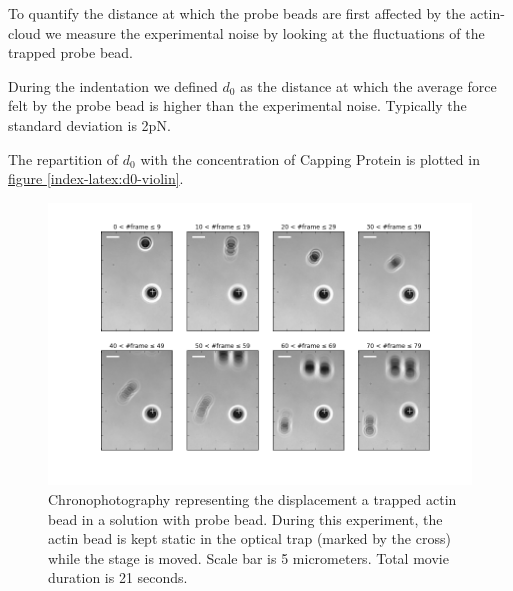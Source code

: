 \documentclass[A4paperpaper,11pt,english]{sphinxmanual}
\begin{document}
To quantify the distance at which the probe beads are first affected by the actin-cloud
we measure the experimental noise by looking at the fluctuations of the trapped probe bead.

During the indentation we defined \(d_0\) as the distance at which the
average force felt by the probe bead is higher than the experimental noise.
Typically the standard deviation is 2pN.

The repartition of \(d_0\) with the concentration of Capping Protein is
plotted in \hyperref[index-latex:d0-violin]{figure  \ref*{index-latex:d0-violin}}.
\begin{figure}[htbp]
\centering
\capstart

\includegraphics[width=0.850\linewidth]{cloud-repelling.png}
\caption{Chronophotography representing the displacement a trapped actin bead in a
solution with probe bead. During this experiment, the actin bead is kept
static in the optical trap (marked by the cross) while the stage is moved.
Scale bar is 5 micrometers. Total movie duration is 21 seconds.}\label{index-latex:cloud-repelling}\end{figure}
\end{document}

